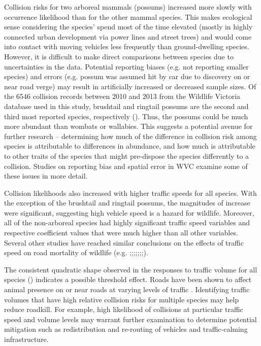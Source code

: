 Collision risks for two arboreal mammals (possums) increased more slowly with occurrence likelihood than for the other mammal species.  This makes ecological sense considering the species’ spend most of the time elevated (mostly in highly connected urban development via power lines and street trees) and would come into contact with moving vehicles less frequently than ground-dwelling species.  However, it is difficult to make direct comparisons between species due to uncertainties in the data.  Potential reporting biases (e.g. not reporting smaller species) and errors (e.g. possum was assumed hit by car due to discovery on or near road verge) may result in artificially increased or decreased sample sizes. Of the 6546 collision records between 2010 and 2013 from the Wildlife Victoria database used in this study, brushtail and ringtail possums are the second and third most reported species, respectively ().  Thus, the possums could be much more abundant than wombats or wallabies. This suggests a potential avenue for further research – determining how much of the difference in collision risk among species is attributable to differences in abundance, and how much is attributable to other traits of the species that might pre-dispose the species differently to a collision. Studies on reporting bias \citep{snow15} and spatial error \citep{guns09} in WVC examine some of these issues in more detail.

Collision likelihoods also increased with higher traffic speeds for all species.  With the exception of the brushtail and ringtail possums, the magnitudes of increase were significant, suggesting high vehicle speed is a hazard for wildlife.  Moreover, all of the non-arboreal species had highly significant traffic speed variables and respective coefficient values that were much higher than all other variables. Several other studies have reached similar conclusions on the effects of traffic speed on road mortality of wildlife (e.g. \cite{farm12};\cite{gkri13};\cite{lao11};\cite{ramp06a};\cite{seil05};\cite{seil06};\cite{sudh09};\cite{vanl09}).

The consistent quadratic shape observed in the responses to traffic volume for all species () indicates a possible threshold effect.  Roads have been shown to affect animal presence on or near roads at varying levels of traffic \citep{jaeg05,rhod14}.  Identifying traffic volumes that have high relative collision risks for multiple species may help reduce roadkill.  For example, high likelihood of collisions at particular traffic speed and volume levels may warrant further examination to determine potential mitigation such as redistribution and re-routing of vehicles and traffic-calming infrastructure.

